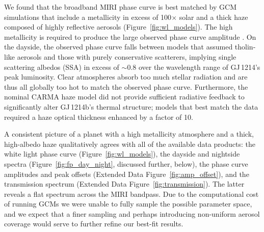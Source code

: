 \documentclass[pdflatex,sn-standardnature]{sn-jnl}%
\begin{document}
We found that the broadband MIRI phase curve is best matched by GCM simulations that include a metallicity in excess of 100$\times$ solar and a thick haze composed of highly reflective aerosols (Figure~\ref{fig:wl_models}).  The high metallicity is required to produce the large observed phase curve amplitude \cite[][Extended Data Figure~\ref{fig:amp_offset}]{kataria14,charnay15b,charnay15,christie22}.  On the dayside, the observed phase curve falls between models that assumed tholin-like aerosols and those with purely conservative scatterers, implying single scattering albedos (SSA) in excess of $\sim$0.8 over the wavelength range of GJ\,1214's peak luminosity. 
 Clear atmospheres absorb too much stellar radiation and are thus all globally too hot to match the observed phase curve.  Furthermore, the nominal CARMA haze model did not provide sufficient radiative feedback to significantly alter GJ\,1214b's thermal structure; models that best match the data required a haze optical thickness enhanced by a factor of 10.  

A consistent picture of a planet with a high metallicity atmosphere and a thick, high-albedo haze qualitatively agrees with all of the available data products: the white light phase curve (Figure~\ref{fig:wl_models}), the dayside and nightside spectra (Figure~\ref{fig:fp_day_night}, discussed further, below), the phase curve amplitudes and peak offsets (Extended Data Figure~\ref{fig:amp_offset}), and the transmission spectrum (Extended Data Figure~\ref{fig:transmission}).  The latter reveals a flat spectrum across the MIRI bandpass.  Due to the computational cost of running GCMs we were unable to fully sample the possible parameter space, and we expect that a finer sampling and perhaps introducing non-uniform aerosol coverage would serve to further refine our best-fit results.

\end{document}
